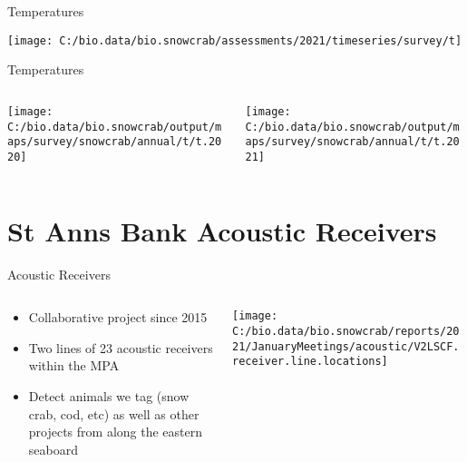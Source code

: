 \documentclass[
  ignorenonframetext,
]{beamer}
\begin{document}
\begin{frame}{Temperatures}
\protect\hypertarget{temperatures}{}
\begin{center}\texttt{[image: C:/bio.data/bio.snowcrab/assessments/2021/timeseries/survey/t]} \end{center}
\end{frame}

\begin{frame}{Temperatures}
\protect\hypertarget{temperatures-1}{}
\begin{columns}[T]
\begin{column}{0.48\textwidth}
\begin{center}\texttt{[image: C:/bio.data/bio.snowcrab/output/maps/survey/snowcrab/annual/t/t.2020]} \end{center}
\end{column}

\begin{column}{0.48\textwidth}
\begin{center}\texttt{[image: C:/bio.data/bio.snowcrab/output/maps/survey/snowcrab/annual/t/t.2021]} \end{center}
\end{column}
\end{columns}
\end{frame}

\hypertarget{st-anns-bank-acoustic-receivers}{%
\section{St Anns Bank Acoustic
Receivers}\label{st-anns-bank-acoustic-receivers}}

\begin{frame}{Acoustic Receivers}
\protect\hypertarget{acoustic-receivers}{}
\begin{columns}[T]
\begin{column}{0.48\textwidth}
\begin{itemize}
\item
  Collaborative project since 2015
\item
  Two lines of 23 acoustic receivers within the MPA
\item
  Detect animals we tag (snow crab, cod, etc) as well as other projects
  from along the eastern seaboard
\end{itemize}
\end{column}

\begin{column}{0.48\textwidth}
\begin{center}\texttt{[image: C:/bio.data/bio.snowcrab/reports/2021/JanuaryMeetings/acoustic/V2LSCF.receiver.line.locations]} \end{center}
\end{column}
\end{columns}
\end{frame}
\end{document}
